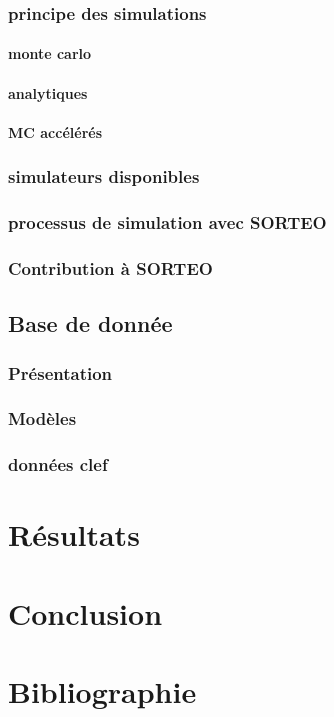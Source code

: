\documentclass[12pt]{book}
\begin{document}
		\section{principe des simulations}
			\subsection{monte carlo}
			\subsection{analytiques}
			\subsection{MC accélérés}

		\section{simulateurs disponibles}
		\section{processus de simulation avec SORTEO}
		\section{Contribution à SORTEO}

	\chapter{Base de donnée}
		\section{Présentation}
		\section{Modèles}
		\section{données clef} %


\part{Résultats}
	


\part{Conclusion}




\part{Bibliographie}


\end{document}
